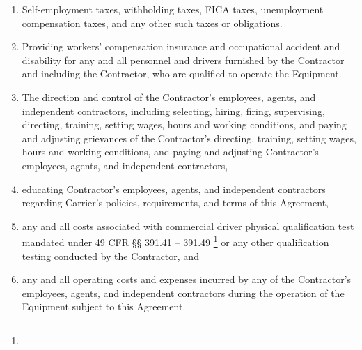 \begin{enumerate}
\begin{enumerate}
        \item Self-employment taxes, withholding taxes, FICA taxes,
        unemployment compensation taxes, and any other such taxes or
        obligations.

        \item Providing workers' compensation insurance and occupational
        accident and disability for any and all personnel and drivers
        furnished by the Contractor and including the Contractor, who are
        qualified to operate the Equipment.

        \item The direction and control of the Contractor's employees,
        agents, and independent contractors, including selecting, hiring,
        firing, supervising, directing, training, setting wages, hours and
        working conditions, and paying and adjusting grievances of the
        Contractor's directing, training, setting wages, hours and working
        conditions, and paying and adjusting Contractor's employees,
        agents, and independent contractors,

        \item educating Contractor's employees, agents, and independent
        contractors regarding Carrier's policies, requirements, and terms
        of this Agreement,

        \item any and all costs associated with commercial driver physical
        qualification test mandated under 49 CFR {\S\S} 391.41 -- 391.49%
        \footnote{\PhysicalQualificationsAndExaminationsFootnote} or
        any other qualification testing conducted by the Contractor, and

        \item any and all operating costs and expenses incurred by any of
        the Contractor's employees, agents, and independent contractors
        during the operation of the Equipment subject to this Agreement.
    \end{enumerate}
\end{enumerate}